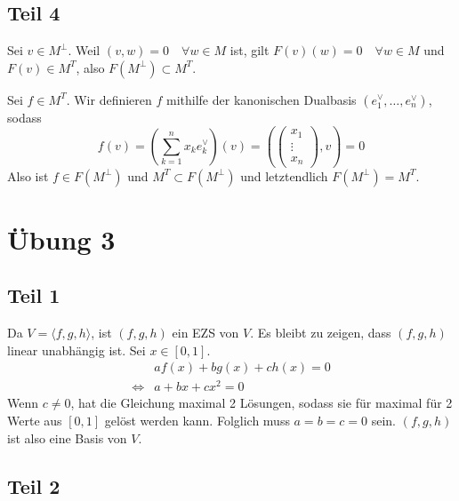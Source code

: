 \documentclass[a4paper,10pt]{article}
\begin{document}
\subsection*{Teil 4}

Sei $v \in M^\perp$.
Weil $(v, w) = 0 \quad \forall w \in M$ ist, gilt $F(v)(w) = 0 \quad \forall w \in M$ und $F(v) \in M^T$, also $F(M^\perp) \subset M^T$.

Sei $f \in M^T$.
Wir definieren $f$ mithilfe der kanonischen Dualbasis $(e_1^\vee, \dots, e_n^\vee)$, sodass
\begin{equation}
 f(v) = (\sum_{k = 1}^n x_k e_k^\vee)(v) =
  \left( \begin{pmatrix}
   x_1\\
   \vdots\\
   x_n
  \end{pmatrix}, v\right) = 0
\end{equation}
Also ist $f \in F(M^\perp)$ und $M^T \subset F(M^\perp)$ und letztendlich $F(M^\perp) = M^T$.

\section*{Übung 3}

\subsection*{Teil 1}

Da $V = \langle f, g, h \rangle$, ist $(f, g, h)$ ein EZS von $V$.
Es bleibt zu zeigen, dass $(f, g, h)$ linear unabhängig ist.
Sei $x \in [0, 1]$.
\begin{align}
 & af(x) + bg(x) + ch(x) = 0\\
 \Leftrightarrow &
 a + bx + cx^2 = 0
\end{align}
Wenn $c \ne 0$, hat die Gleichung maximal 2 Lösungen, sodass sie für maximal für 2 Werte aus $[0, 1]$ gelöst werden kann.
Folglich muss $a = b = c = 0$ sein.
$(f, g, h)$ ist also eine Basis von $V$.

\subsection*{Teil 2}
\end{document}
